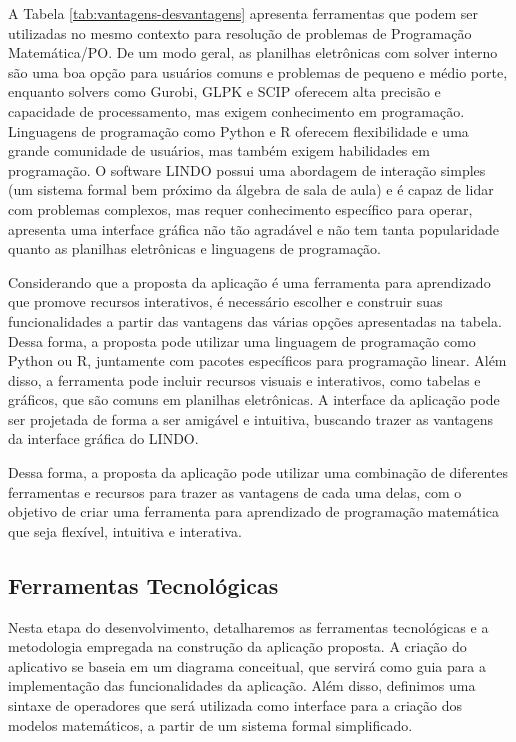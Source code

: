 \documentclass{article}
\begin{document}
A Tabela \ref{tab:vantagens-desvantagens} apresenta ferramentas que podem ser utilizadas no mesmo contexto para resolução de problemas de Programação Matemática/PO. De um modo geral, as planilhas eletrônicas com solver interno são uma boa opção para usuários comuns e problemas de pequeno e médio porte, enquanto solvers como Gurobi, GLPK e SCIP oferecem alta precisão e capacidade de processamento, mas exigem conhecimento em programação. Linguagens de programação como Python e R oferecem flexibilidade e uma grande comunidade de usuários, mas também exigem habilidades em programação. O software LINDO possui uma abordagem de interação simples (um sistema formal bem próximo da álgebra de sala de aula) e é capaz de lidar com problemas complexos, mas requer conhecimento específico para operar, apresenta uma interface gráfica não tão agradável e não tem tanta popularidade quanto as planilhas eletrônicas e linguagens de programação.

Considerando que a proposta da aplicação é uma ferramenta para aprendizado que promove recursos interativos, é necessário escolher e construir suas funcionalidades a partir das vantagens das várias opções apresentadas na tabela. Dessa forma, a proposta pode utilizar uma linguagem de programação como Python ou R, juntamente com pacotes específicos para programação linear. Além disso, a ferramenta pode incluir recursos visuais e interativos, como tabelas e gráficos, que são comuns em planilhas eletrônicas. A interface da aplicação pode ser projetada de forma a ser amigável e intuitiva, buscando trazer as vantagens da interface gráfica do LINDO.

Dessa forma, a proposta da aplicação pode utilizar uma combinação de diferentes ferramentas e recursos para trazer as vantagens de cada uma delas, com o objetivo de criar uma ferramenta para aprendizado de programação matemática que seja flexível, intuitiva e interativa.

\subsection{Ferramentas Tecnológicas}

Nesta etapa do desenvolvimento, detalharemos as ferramentas tecnológicas e a metodologia empregada na construção da aplicação proposta. A criação do aplicativo se baseia em um diagrama conceitual, que servirá como guia para a implementação das funcionalidades da aplicação. Além disso, definimos uma sintaxe de operadores que será utilizada como interface para a criação dos modelos matemáticos, a partir de um sistema formal simplificado.
\end{document}
